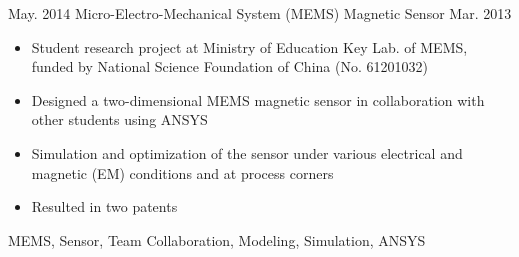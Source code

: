 \begin{projects}
  \project
    {May. 2014}   {Micro-Electro-Mechanical System (MEMS) Magnetic Sensor}
    {Mar. 2013} {
                      \begin{itemize}
                        \item Student research project at Ministry of Education Key Lab. of MEMS, funded by National Science Foundation of China (No. 61201032)
                        \item Designed a two-dimensional MEMS magnetic sensor in collaboration with other students using ANSYS
                        \item Simulation and optimization of the sensor under various electrical and magnetic (EM) conditions and at process corners
                        \item Resulted in two patents
                      \end{itemize}
                    }
                    {MEMS, Sensor, Team Collaboration, Modeling, Simulation, ANSYS}

\end{projects}
